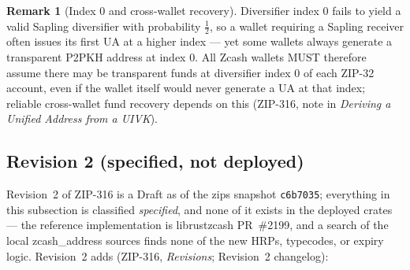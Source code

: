 \documentclass[11pt,a4paper]{article}
\theoremstyle{definition}
\newtheorem{remark}[theorem]{Remark}
\begin{document}
\begin{remark}[Index $0$ and cross-wallet recovery]\label{rem:index0}
Diversifier index $0$ fails to yield a valid Sapling diversifier with
probability $\tfrac12$, so a wallet requiring a Sapling receiver often
issues its first UA at a higher index --- yet some wallets always generate
a transparent P2PKH address at index $0$. All Zcash wallets MUST therefore
assume there may be transparent funds at diversifier index $0$ of each
ZIP-32 account, even if the wallet itself would never generate a UA at
that index; reliable cross-wallet fund recovery depends on this (ZIP-316,
note in \emph{Deriving a Unified Address from a UIVK}).
\end{remark}

\subsection{Revision 2 (specified, not deployed)}\label{sec:addresses-r2}

Revision~2 of ZIP-316 is a Draft as of the \textsf{zips} snapshot
\texttt{c6b7035}; everything in this subsection is classified
\emph{specified}, and none of it exists in the deployed crates --- the
reference implementation is \textsf{librustzcash} PR~\#2199, and a search
of the local \textsf{zcash\_address} sources finds none of the new HRPs,
typecodes, or expiry logic. Revision~2 adds (ZIP-316, \emph{Revisions};
Revision~2 changelog):
\end{document}

